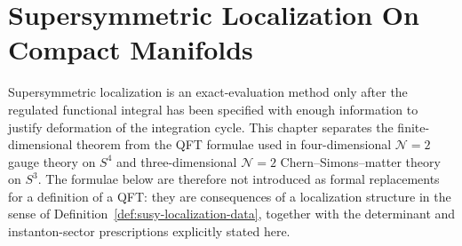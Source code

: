 \chapter{Supersymmetric Localization On Compact Manifolds}
\label{ch:susy-localization-compact-manifolds}

\ConventionsMixed

Supersymmetric localization is an exact-evaluation method only after the
regulated functional integral has been specified with enough information to
justify deformation of the integration cycle.  This chapter separates the
finite-dimensional theorem from the QFT formulae used in four-dimensional
\(\mathcal N=2\) gauge theory on \(S^4\) and three-dimensional
\(\mathcal N=2\) Chern--Simons--matter theory on \(S^3\).  The formulae below
are therefore not introduced as formal replacements for a definition of a QFT:
they are consequences of a localization structure in the sense of
Definition~\ref{def:susy-localization-data}, together with the determinant
and instanton-sector prescriptions explicitly stated here.

